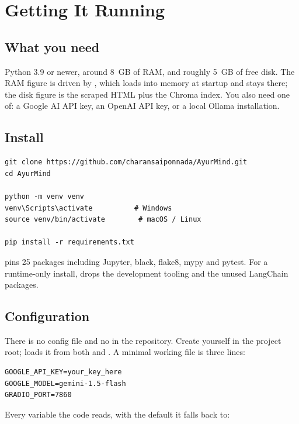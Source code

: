 \chapter{Getting It Running}

\section{What you need}

Python 3.9 or newer, around 8~GB of RAM, and roughly 5~GB of free disk. The RAM figure is driven by , which loads into memory at startup and stays there; the disk figure is the scraped HTML plus the Chroma index. You also need one of: a Google AI API key, an OpenAI API key, or a local Ollama installation.

\section{Install}

\begin{lstlisting}[style=shell]
git clone https://github.com/charansaiponnada/AyurMind.git
cd AyurMind

python -m venv venv
venv\Scripts\activate          # Windows
source venv/bin/activate        # macOS / Linux

pip install -r requirements.txt
\end{lstlisting}

 pins 25 packages including Jupyter, black, flake8, mypy and pytest. For a runtime-only install,  drops the development tooling and the unused LangChain packages.

\section{Configuration}

There is no config file and no  in the repository. Create  yourself in the project root;  loads it from both  and . A minimal working file is three lines:

\begin{lstlisting}[style=shell]
GOOGLE_API_KEY=your_key_here
GOOGLE_MODEL=gemini-1.5-flash
GRADIO_PORT=7860
\end{lstlisting}

Every variable the code reads, with the default it falls back to:

